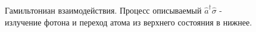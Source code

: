 \begin{figure}
\centering



\caption{Гамильтониан взаимодействия. Процесс описываемый $\hat{a}^{\dag}\hat{\sigma}$ - излучение
  фотона и переход атома из верхнего состояния в нижнее.}
\label{figPart1Ch2_2_3}
\end{figure}
